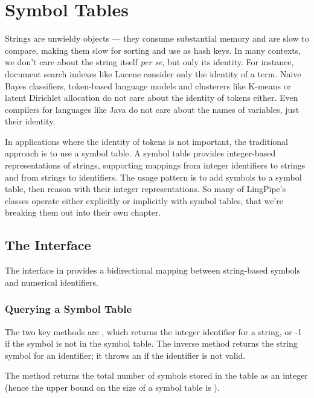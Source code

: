 \chapter{Symbol Tables}\label{chapter:symbol-tables}

Strings are unwieldy objects --- they consume substantial memory and
are slow to compare, making them slow for sorting and use as hash
keys.  In many contexts, we don't care about the string itself {\it
  per se}, but only its identity.  For instance, document search
indexes like Lucene consider only the identity of a term.  Naive Bayes
classifiers, token-based language models and clusterers like K-means
or latent Dirichlet allocation do not care about the identity of
tokens either.  Even compilers for languages like Java do not care
about the names of variables, just their identity.

In applications where the identity of tokens is not important, the
traditional approach is to use a symbol table.  A symbol table
provides integer-based representations of strings, supporting mappings
from integer identifiers to strings and from strings to identifiers.
The usage pattern is to add symbols to a symbol table, then reason
with their integer representations.  So many of LingPipe's classes
operate either explicitly or implicitly with symbol tables, that
we're breaking them out into their own chapter.

\section{The  Interface}

The interface  in  provides
a bidirectional mapping between string-based symbols and numerical
identifiers. 

\subsection{Querying a Symbol Table}

The two key methods are , which returns the
integer identifier for a string, or -1 if the symbol is not in the
symbol table.  The inverse method  returns the
string symbol for an identifier; it throws an
 if the identifier is not valid.  

The method  returns the total number of symbols
stored in the table as an integer (hence the upper bound on the size
of a symbol table is ).

